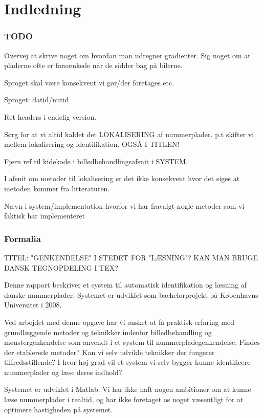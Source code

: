 \section{Indledning}

\subsubsection*{TODO}
Overvej at skrive noget om hvordan man udregner gradienter.
Sig noget om at pladerne ofte er forsænkede når de sidder bag på bilerne.

Sproget skal være konsekvent vi gør/der foretages etc.

Sproget: datid/nutid

Ret headers i endelig version.

Sørg for at vi altid kaldet det LOKALISERING af nummerplader. p.t skifter vi mellem lokalisering og identifikation. OGSÅ I TITLEN!


Fjern ref til kidekode i billedbehandlingsafsnit i SYSTEM.

I afsnit om metoder til lokalisering er det ikke konsekvent hvor det siges at metoden kommer fra litteraturen.

Nævn i system/implementation hvorfor vi har fravalgt nogle metoder som vi faktisk har implementeret

\subsubsection*{Formalia}

TITEL: "GENKENDELSE" I STEDET FOR "LÆSNING"?
KAN MAN BRUGE DANSK TEGNOPDELING I TEX?

Denne rapport beskriver et system til automatisk identifikation og læsning af danske nummerplader. Systemet er udviklet som bachelorprojekt på Københavns Universitet i 2008.

Ved arbejdet med denne opgave har vi ønsket at få praktisk erfaring med grundlæggende metoder og teknikker indenfor billedbehandling og mønstergenkendelse som anvendt i et system til nummerpladegenkendelse. Findes der etablerede metoder? Kan vi selv udvikle teknikker der fungerer tilfredsstillende? I hvor høj grad vil et system vi selv bygger kunne identificere nummerplader og læse deres indhold?

Systemet er udviklet i Matlab. Vi har ikke haft nogen ambitioner om at kunne læse nummerplader i realtid, og har ikke foretaget os noget væsentligt for at optimere hastigheden på systemet.

